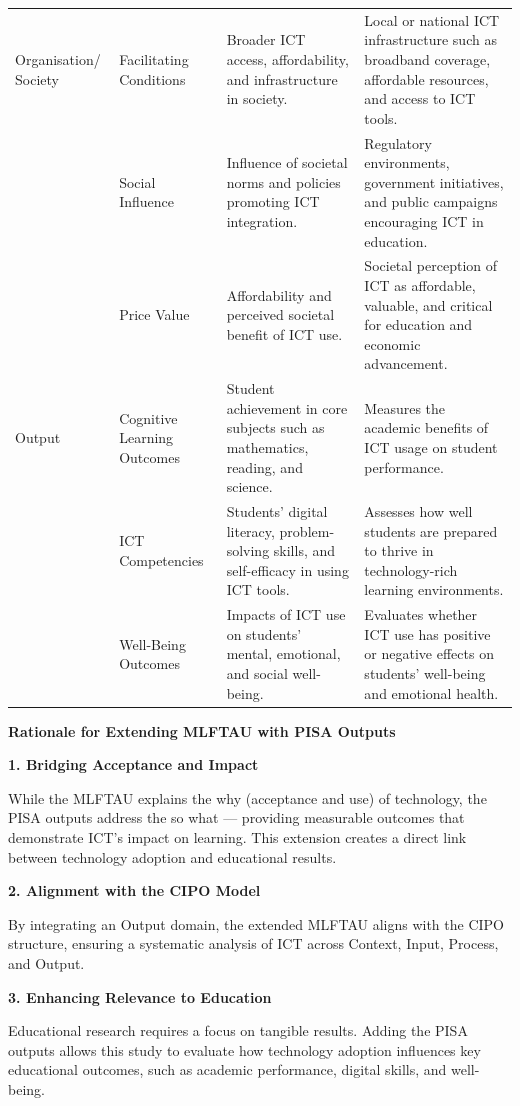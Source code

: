 \documentclass[
]{article}
\begin{document}
\begin{longtable}[t]{>{\raggedright\arraybackslash}p{2cm}>{\raggedright\arraybackslash}p{3cm}>{\raggedright\arraybackslash}p{5cm}>{\raggedright\arraybackslash}p{5cm}}
Organisation/ Society & Facilitating Conditions & Broader ICT access, affordability, and infrastructure in society. & Local or national ICT infrastructure such as broadband coverage, affordable resources, and access to ICT tools.\\
 & Social Influence & Influence of societal norms and policies promoting ICT integration. & Regulatory environments, government initiatives, and public campaigns encouraging ICT in education.\\
\addlinespace
 & Price Value & Affordability and perceived societal benefit of ICT use. & Societal perception of ICT as affordable, valuable, and critical for education and economic advancement.\\
Output & Cognitive Learning Outcomes & Student achievement in core subjects such as mathematics, reading, and science. & Measures the academic benefits of ICT usage on student performance.\\
 & ICT Competencies & Students' digital literacy, problem-solving skills, and self-efficacy in using ICT tools. & Assesses how well students are prepared to thrive in technology-rich learning environments.\\
 & Well-Being Outcomes & Impacts of ICT use on students’ mental, emotional, and social well-being. & Evaluates whether ICT use has positive or negative effects on students' well-being and emotional health.\\
\bottomrule
\end{longtable}

\textbf{Rationale for Extending MLFTAU with PISA Outputs}

\textbf{1. Bridging Acceptance and Impact}

While the MLFTAU explains the why (acceptance and use) of technology,
the PISA outputs address the so what --- providing measurable outcomes
that demonstrate ICT's impact on learning. This extension creates a
direct link between technology adoption and educational results.

\textbf{2. Alignment with the CIPO Model}

By integrating an Output domain, the extended MLFTAU aligns with the
CIPO structure, ensuring a systematic analysis of ICT across Context,
Input, Process, and Output.

\textbf{3. Enhancing Relevance to Education}

Educational research requires a focus on tangible results. Adding the
PISA outputs allows this study to evaluate how technology adoption
influences key educational outcomes, such as academic performance,
digital skills, and well-being.
\end{document}
